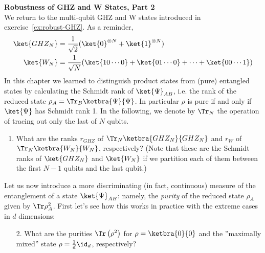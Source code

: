 \begin{exercises}
\item {\bf Robustness of GHZ and W States, Part 2}\\
We return to the multi-qubit GHZ and W states  introduced in exercise~\ref{ex:robust-GHZ}. As a reminder,
\begin{align*}
\ket{GHZ_N} &= \frac{1}{\sqrt{2}} (\ket{0}^{\otimes N}+\ket{1}^{\otimes N}) \\
\ket{W_N} &= \frac{1}{\sqrt{N}} (\ket{10\cdots0}+\ket{01\cdots0}+\cdots+\ket{00\cdots1})
\end{align*}
In this chapter we learned to distinguish product states from (pure) entangled states by calculating the Schmidt rank of $\ket{\Psi}_{AB}$, i.e. the rank of the reduced state $\rho_A=\Tr_B \ketbra{\Psi}{\Psi}$. In particular $\rho$ is pure if and only if $\ket{\Psi}$ has Schmidt rank 1. In the following, we denote by $\Tr_N$ the operation of tracing out only the last of $N$ qubits.
\begin{enumerate}
\item What are the ranks $r_{GHZ}$ of $\Tr_N \ketbra{GHZ_N}{GHZ_N}$ and $r_W$ of $\Tr_N \ketbra{W_N}{W_N}$, respectively? (Note that these are the Schmidt ranks of $\ket{GHZ_N}$ and $\ket{W_N}$ if we partition each of them between the first $N-1$ qubits and the last qubit.)
%
\end{enumerate}
 Let us now introduce a more discriminating (in fact, continuous) measure of the entanglement of a state $\ket{\Psi}_{AB}$: namely, the \textit{purity} of the reduced state $\rho_A$ given by $\Tr \rho_A^2 $. First let's see how this works in practice with the extreme cases in $d$ dimensions:
\begin{enumerate}
\item[2.] What are the purities $\Tr \left(\rho^2\right)$ for $\rho=\ketbra{0}{0}$ and the ''maximally mixed'' state $\rho=\frac{1}{d} \id_d$, respectively?

\end{enumerate}
\end{exercises}
